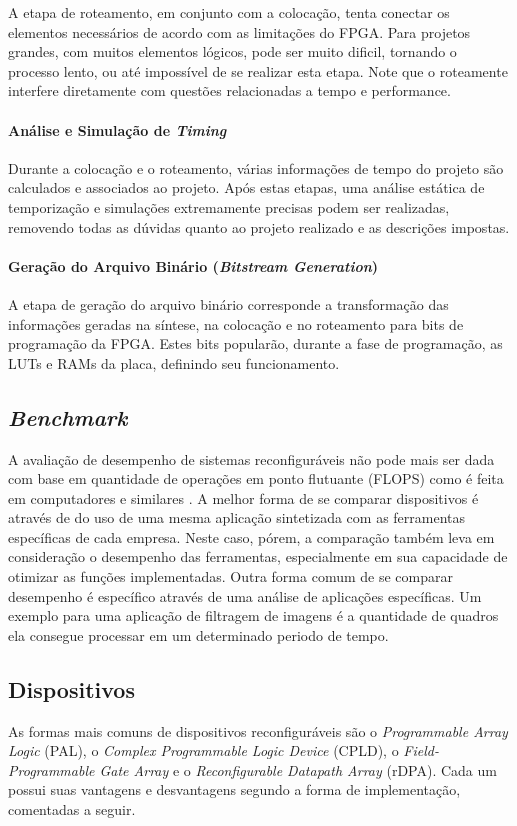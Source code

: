 \documentclass[11pt,a4paper,oneside]{book}
\begin{document}
A etapa de roteamento, em conjunto com a colocação, tenta conectar os elementos necessários de acordo com as limitações do FPGA.
Para projetos grandes, com muitos elementos lógicos, pode ser muito dificil, tornando o processo lento, ou até impossível de se realizar esta etapa.
Note que o roteamente interfere diretamente com questões relacionadas a tempo e performance.

\paragraph{Análise e Simulação de \textit{Timing}}
Durante a colocação e o roteamento, várias informações de tempo do projeto são calculados e associados ao projeto.
Após estas etapas, uma análise estática de temporização e simulações extremamente precisas podem ser realizadas, removendo todas as dúvidas quanto ao projeto realizado e as descrições impostas.

\paragraph{Geração do Arquivo Binário (\textit{Bitstream Generation})}
A etapa de geração do arquivo binário corresponde a transformação das informações geradas na síntese, na colocação e no roteamento para bits de programação da FPGA.
Estes bits popularão, durante a fase de programação, as LUTs e RAMs da placa, definindo seu funcionamento.

\subsection{\textit{Benchmark}}
A avaliação de desempenho de sistemas reconfiguráveis não pode mais ser dada com base em quantidade de operações em ponto flutuante (FLOPS) como é feita em computadores e similares \cite{patterson2005coa, cullinan2012computing}.
A melhor forma de se comparar dispositivos é através de do uso de uma mesma aplicação sintetizada com as ferramentas específicas de cada empresa.
Neste caso, pórem, a comparação também leva em consideração o desempenho das ferramentas, especialmente em sua capacidade de otimizar as funções implementadas.
Outra forma comum de se comparar desempenho é específico através de uma análise de aplicações específicas.
Um exemplo para uma aplicação de filtragem de imagens é a quantidade de quadros ela consegue processar em um determinado periodo de tempo.

\subsection{Dispositivos}
As formas mais comuns de dispositivos reconfigur\'aveis s\~ao o \textit{Programmable Array Logic} (PAL), o \textit{Complex Programmable Logic Device} (CPLD), o \textit{Field-Programmable Gate Array} e o \textit{Reconfigurable Datapath Array} (rDPA).
Cada um possui suas vantagens e desvantagens segundo a forma de implementa\c{c}\~ao, comentadas a seguir.
\end{document}
